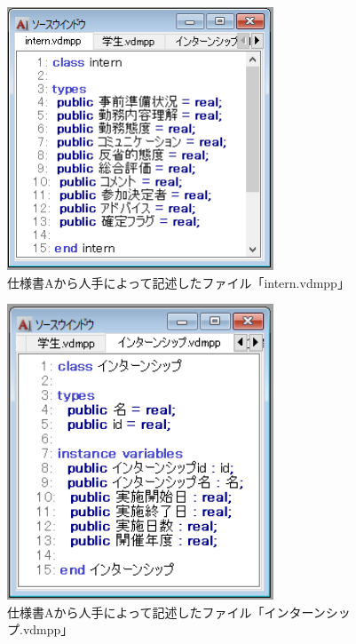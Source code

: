 \begin{figure}[tp]
    \begin{center}
    \includegraphics[width=300]{image/speA_vdm1.PNG}
    \caption{仕様書Aから人手によって記述したファイル「intern.vdmpp」}
    \label{fig:speA_vdm1}
    \end{center}
\end{figure}

\begin{figure}[tp]
    \begin{center}
    \includegraphics[width=300]{image/speA_vdm2.PNG}
    \caption{仕様書Aから人手によって記述したファイル「インターンシップ.vdmpp」}
    \label{fig:speA_vdm2}
    \end{center}
\end{figure}

